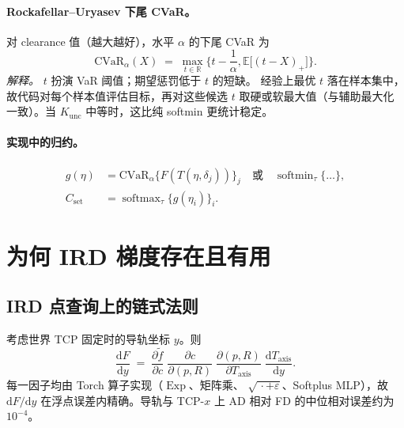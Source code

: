 \documentclass[UTF8,a4paper,11pt,fontset=fandol]{ctexart}
\newcommand{\R}{\mathbb{R}}
\newcommand{\Taxis}{T_{\mathrm{axis}}}
\newcommand{\softmin}{\operatorname{softmin}}
\newcommand{\softmax}{\operatorname{softmax}}
\newcommand{\CVaR}{\mathrm{CVaR}}
\begin{document}
\paragraph{Rockafellar--Uryasev 下尾 CVaR。}
对 clearance 值（越大越好），水平 \(\alpha\) 的下尾 CVaR 为
\begin{equation}
\label{eq:cvar}
  \CVaR_{\alpha}(X)
  \;=\;
  \max_{t\in\R}
  \Biggl\{
    t
    -
    \frac{1}{\alpha},
    \mathbb{E}\bigl[(t-X)_{+}\bigr]
  \Biggr\}.
\end{equation}
\emph{解释。}
\(t\) 扮演 VaR 阈值；期望惩罚低于 \(t\) 的短缺。
经验上最优 \(t\) 落在样本集中，故代码对每个样本值评估目标，再对这些候选
\(t\) 取硬或软最大值（与辅助最大化一致）。当 \(K_{\mathrm{unc}}\) 中等时，这比纯 softmin 更统计稳定。

\paragraph{实现中的归约。}
\begin{equation}
\label{eq:set-query}
\begin{aligned}
  g(\eta)
  &=
  \CVaR_{\alpha}\bigl\{F(T(\eta,\delta_{j}))\bigr\}_{j}
  \quad\text{或}\quad
  \softmin_{\tau}\{\ldots\},
  \\
  C_{\mathrm{set}}
  &=
  \softmax_{\tau}\bigl\{g(\eta_{i})\bigr\}_{i}.
\end{aligned}
\end{equation}

\section{为何 IRD 梯度存在且有用}
\label{sec:gradients}

\subsection{IRD 点查询上的链式法则}
\label{sec:chain}

考虑世界 TCP 固定时的导轨坐标 \(y\)。则
\begin{equation}
\label{eq:chain-rail}
  \frac{\mathrm{d}F}{\mathrm{d}y}
  \;=\;
  \frac{\partial\tilde f}{\partial c}\;
  \frac{\partial c}{\partial (p,R)}\;
  \frac{\partial (p,R)}{\partial \Taxis}\;
  \frac{\mathrm{d}\Taxis}{\mathrm{d}y}.
\end{equation}
每一因子均由 Torch 算子实现（\(\operatorname{Exp}\)、矩阵乘、
\(\sqrt{\,\cdot+\varepsilon}\)、Softplus MLP），故 \(\mathrm{d}F/\mathrm{d}y\)
在浮点误差内精确。导轨与 TCP-\(x\) 上 AD 相对 FD 的中位相对误差约为 \(10^{-4}\)。
\end{document}
